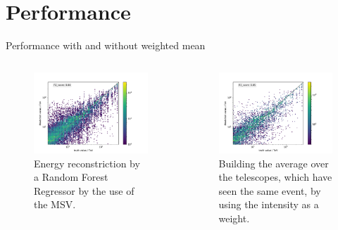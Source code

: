 \documentclass[aspectratio=1610, professionalfonts, 9pt]{beamer}
\begin{document}
\section{Performance}
  \begin{frame}{Performance with and without weighted mean}
      \begin{columns}
        \begin{column}{0.5\textwidth}
          \begin{figure}
            \centering
            \includegraphics[width=\textwidth]{Plots/RF_MSV.pdf}
            \caption{Energy reconstriction by a Random Forest Regressor by the use of the MSV.}
          \end{figure}
        \end{column}
        \begin{column}{0.5\textwidth}
          \begin{figure}
            \centering
            \includegraphics[width=\textwidth]{Plots/RF_MSV_wI_mean.pdf}
            \caption{Building the average over the telescopes, which have seen the same event, by using the intensity as a weight.}
          \end{figure}
        \end{column}
      \end{columns}
  \end{frame}
\end{document}
